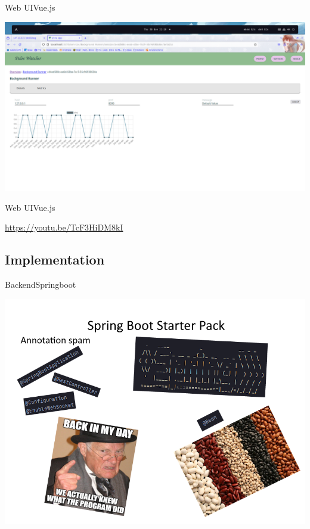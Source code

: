\documentclass{beamer}
\begin{document}
\begin{frame}{Web UI}{Vue.js}

\includegraphics[width=\linewidth,keepaspectratio]{web_ui_3.png}

\end{frame}

\begin{frame}{Web UI}{Vue.js}

\url{https://youtu.be/TcF3HiDM8kI}

\end{frame}


\subsection{Implementation}

\begin{frame}{Backend}{Springboot}

\includegraphics[width=\linewidth,keepaspectratio]{spring_boot_meme.png}


\end{frame}
\end{document}
